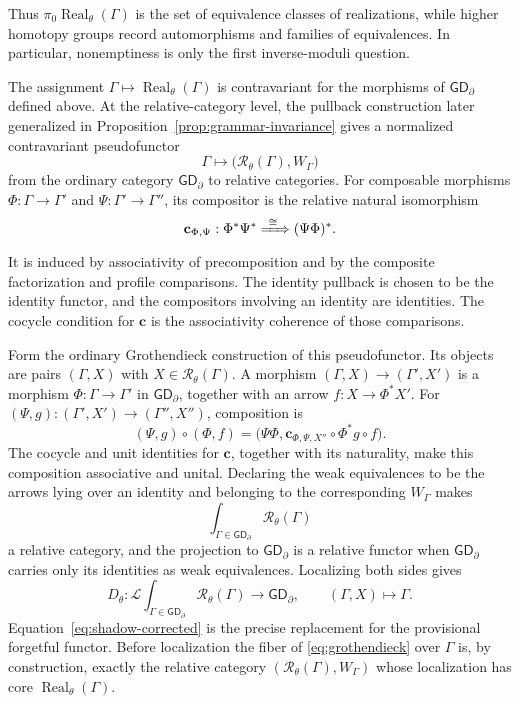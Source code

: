 \documentclass[11pt,letterpaper,twoside]{article}
\theoremstyle{plain}
\theoremstyle{definition}
\theoremstyle{remark}
\newcommand{\BGrm}{\mathsf{GD}_{\partial}}
\newcommand{\Real}{\operatorname{Real}}
\begin{document}
Thus \(\pi_0\Real_\theta(\Gamma)\) is the set of equivalence classes of realizations, while higher homotopy groups record automorphisms and families of equivalences.  In particular, nonemptiness is only the first inverse-moduli question.

The assignment \(\Gamma\mapsto\Real_\theta(\Gamma)\) is contravariant for the morphisms of \(\BGrm\) defined above.  At the relative-category level, the pullback construction later generalized in Proposition~\ref{prop:grammar-invariance} gives a normalized contravariant pseudofunctor
\[
 \Gamma\longmapsto\bigl(\mathcal R_\theta(\Gamma),W_\Gamma\bigr)
\]
from the ordinary category \(\BGrm\) to relative categories.  For composable morphisms \(\Phi:\Gamma\to\Gamma'\) and \(\Psi:\Gamma'\to\Gamma''\), its compositor is the relative natural isomorphism
\begin{equation}\label{eq:pullback-compositor}
 \mathbf c_{\Phi,\Psi}:\Phi^*\Psi^*\xRightarrow{\ \cong\ }(\Psi\Phi)^*.
\end{equation}
It is induced by associativity of precomposition and by the composite factorization and profile comparisons.  The identity pullback is chosen to be the identity functor, and the compositors involving an identity are identities.  The cocycle condition for \(\mathbf c\) is the associativity coherence of those comparisons.

Form the ordinary Grothendieck construction of this pseudofunctor.  Its objects are pairs \((\Gamma,X)\) with \(X\in\mathcal R_\theta(\Gamma)\).  A morphism \((\Gamma,X)\to(\Gamma',X')\) is a morphism \(\Phi:\Gamma\to\Gamma'\) in \(\BGrm\), together with an arrow \(f:X\to\Phi^*X'\).  For \((\Psi,g):(\Gamma',X')\to(\Gamma'',X'')\), composition is
\begin{equation}\label{eq:grothendieck-composition}
 (\Psi,g)\circ(\Phi,f)
 =\bigl(\Psi\Phi,\mathbf c_{\Phi,\Psi,X''}\circ\Phi^*g\circ f\bigr).
\end{equation}
The cocycle and unit identities for \(\mathbf c\), together with its naturality, make this composition associative and unital.  Declaring the weak equivalences to be the arrows lying over an identity and belonging to the corresponding \(W_\Gamma\) makes
\begin{equation}\label{eq:grothendieck}
 \int_{\Gamma\in\BGrm}\mathcal R_\theta(\Gamma)
\end{equation}
a relative category, and the projection to \(\BGrm\) is a relative functor when \(\BGrm\) carries only its identities as weak equivalences.  Localizing both sides gives
\begin{equation}\label{eq:shadow-corrected}
 D_\theta:
 \mathcal L\!\int_{\Gamma\in\BGrm}\mathcal R_\theta(\Gamma)
 \longrightarrow \BGrm,
 \qquad (\Gamma,X)\longmapsto\Gamma.
\end{equation}
Equation~\eqref{eq:shadow-corrected} is the precise replacement for the provisional forgetful functor.  Before localization the fiber of \eqref{eq:grothendieck} over \(\Gamma\) is, by construction, exactly the relative category \((\mathcal R_\theta(\Gamma),W_\Gamma)\) whose localization has core \(\Real_\theta(\Gamma)\).
\end{document}
